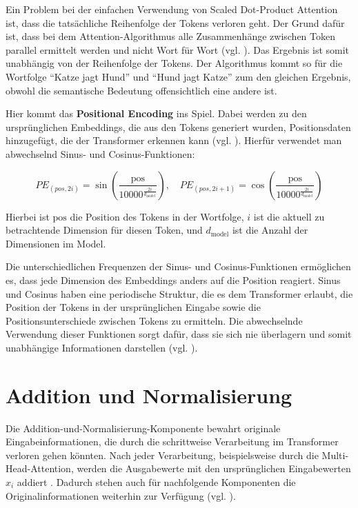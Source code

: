 Ein Problem bei der einfachen Verwendung von Scaled Dot-Product Attention ist, dass die tatsächliche Reihenfolge der Tokens verloren geht.  
Der Grund dafür ist, dass bei dem Attention-Algorithmus alle Zusammenhänge zwischen Token parallel ermittelt werden und nicht Wort für Wort (vgl. \cite[S. 6]{attention}).   
Das Ergebnis ist somit unabhängig von der Reihenfolge der Tokens.
Der Algorithmus kommt so für die Wortfolge \enquote{Katze jagt Hund} und \enquote{Hund jagt Katze} zum den gleichen Ergebnis, obwohl die semantische Bedeutung offensichtlich eine andere ist. 

Hier kommt das \textbf{Positional Encoding} ins Spiel.  
Dabei werden zu den ursprünglichen Embeddings, die aus den Tokens generiert wurden, Positionsdaten hinzugefügt, die der Transformer erkennen kann (vgl. \cite[S. 6]{attention}).  
Hierfür verwendet man abwechselnd Sinus- und Cosinus-Funktionen:

\[
PE_{(pos, 2i)} = \sin\left(\frac{\text{pos}}{10000^{\frac{2i}{d_{\text{model}}}}}\right), \quad
PE_{(pos, 2i+1)} = \cos\left(\frac{\text{pos}}{10000^{\frac{2i}{d_{\text{model}}}}}\right)
\]

Hierbei ist \( \text{pos} \) die Position des Tokens in der Wortfolge, \( i \) ist die aktuell zu betrachtende Dimension für diesen Token, und \( d_{\text{model}} \) ist die Anzahl der Dimensionen im Model.

Die unterschiedlichen Frequenzen der Sinus- und Cosinus-Funktionen ermöglichen es, dass jede Dimension des Embeddings anders auf die Position reagiert.  
Sinus und Cosinus haben eine periodische Struktur, die es dem Transformer erlaubt, die Position der Tokens in der ursprünglichen Eingabe sowie die Positionsunterschiede zwischen Tokens zu ermitteln.  
Die abwechselnde Verwendung dieser Funktionen sorgt dafür, dass sie sich nie überlagern und somit unabhängige Informationen darstellen (vgl. \cite[S. 208]{paass.2020}).

\section{Addition und Normalisierung}

Die Addition-und-Normalisierung-Komponente bewahrt originale Eingabeinformationen, die durch die schrittweise Verarbeitung im Transformer verloren gehen könnten. 
Nach jeder Verarbeitung, beispielsweise durch die Multi-Head-Attention, werden die Ausgabewerte mit den ursprünglichen Eingabewerten \( x_i \) addiert . 
Dadurch stehen auch für nachfolgende Komponenten die Originalinformationen weiterhin zur Verfügung (vgl. \cite[K. 3]{layernorm}).

